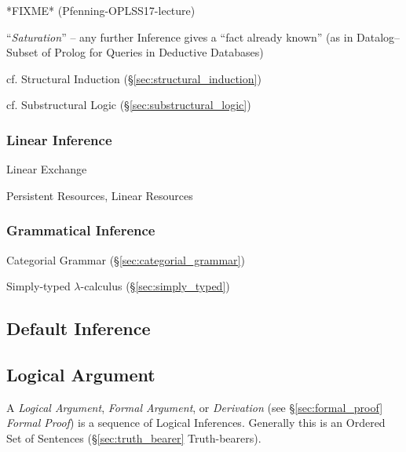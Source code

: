 *FIXME* (Pfenning-OPLSS17-lecture)

``\emph{Saturation}'' -- any further Inference gives a ``fact already
known'' (as in Datalog-- Subset of Prolog for Queries in Deductive
Databases)

\fist cf. Structural Induction (\S\ref{sec:structural_induction})

\fist cf. Substructural Logic (\S\ref{sec:substructural_logic})



\subsubsection{Linear Inference}\label{sec:linear_inference}

Linear Exchange

Persistent Resources, Linear Resources



\subsubsection{Grammatical Inference}\label{sec:grammatical_inference}

\fist Categorial Grammar (\S\ref{sec:categorial_grammar})

\fist Simply-typed $\lambda$-calculus (\S\ref{sec:simply_typed})



\subsection{Default Inference}\label{sec:default_inference}

\subsection{Logical Argument}\label{sec:logical_argument}

A \emph{Logical Argument}, \emph{Formal Argument}, or
\emph{Derivation} (see \S\ref{sec:formal_proof} \emph{Formal Proof})
is a sequence of Logical Inferences. Generally this is an Ordered Set
of Sentences (\S\ref{sec:truth_bearer} Truth-bearers).



